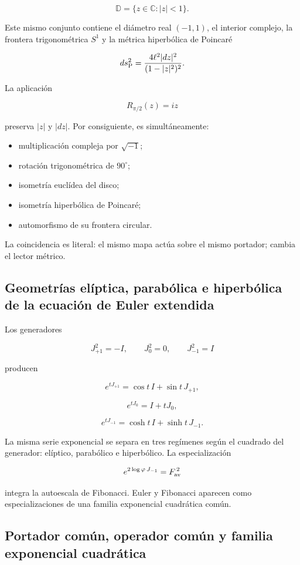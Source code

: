 \[
\mathbb D=\{z\in\mathbb C:|z|<1\}.
\]

Este mismo conjunto contiene el diámetro real \((-1,1)\), el interior complejo, la frontera trigonométrica \(S^1\) y la métrica hiperbólica de Poincaré

\[
ds_{\rm P}^2=\frac{4\ell^2|dz|^2}{(1-|z|^2)^2}.
\]

La aplicación

\[
R_{\pi/2}(z)=iz
\]

preserva \(|z|\) y \(|dz|\). Por consiguiente, es simultáneamente:

\begin{itemize}
\item multiplicación compleja por \(\sqrt{-1}\);
\item rotación trigonométrica de \(90^\circ\);
\item isometría euclídea del disco;
\item isometría hiperbólica de Poincaré;
\item automorfismo de su frontera circular.
\end{itemize}

La coincidencia es literal: el mismo mapa actúa sobre el mismo portador; cambia el lector métrico.

\subsection{Geometrías elíptica, parabólica e hiperbólica de la ecuación de Euler extendida}

Los generadores

\[
J_{+1}^2=-I,\qquad
J_0^2=0,\qquad
J_{-1}^2=I
\]

producen

\[
e^{tJ_{+1}}=\cos t\,I+\sin t\,J_{+1},
\]

\[
e^{tJ_0}=I+tJ_0,
\]

\[
e^{tJ_{-1}}=\cosh t\,I+\sinh t\,J_{-1}.
\]

La misma serie exponencial se separa en tres regímenes según el cuadrado del generador: elíptico, parabólico e hiperbólico. La especialización

\[
e^{2\log\varphi\,J_{-1}}=F_{\rm av}^{\,2}
\]

integra la autoescala de Fibonacci. Euler y Fibonacci aparecen como especializaciones de una familia exponencial cuadrática común.

\subsection{Portador común, operador común y familia exponencial cuadrática}

